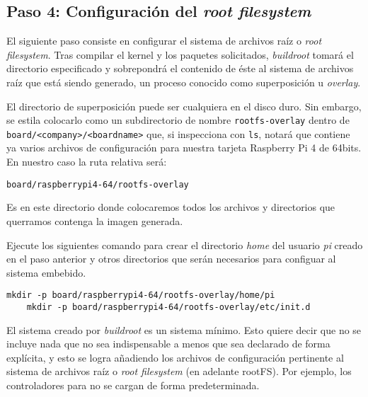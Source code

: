 %
%



\subsection{Paso 4: Configuración del \emph{root filesystem}}%
\label{sec:step4}
El siguiente paso consiste en configurar el sistema de archivos raíz o \emph{root filesystem}.
Tras compilar el kernel y los paquetes solicitados, \emph{buildroot} tomará el directorio especificado y sobrepondrá el contenido de éste al sistema de archivos raíz que está siendo generado, un proceso conocido como superposición u \emph{overlay}.

El directorio de superposición puede ser cualquiera en el disco duro.
Sin embargo, se estila colocarlo como un subdirectorio de nombre \texttt{rootfs-overlay} dentro de \texttt{board/<company>/<boardname>}
que, si inspecciona con \texttt{ls}, notará que contiene ya varios archivos de configuración para nuestra tarjeta Raspberry Pi 4 de 64bits.
En nuestro caso la ruta relativa será:

\begin{Verbatim}[gobble=1]
	board/raspberrypi4-64/rootfs-overlay
\end{Verbatim}

Es en este directorio donde colocaremos todos los archivos y directorios que querramos contenga la imagen generada.

Ejecute los siguientes comando para crear el directorio \emph{home} del usuario \emph{pi} creado en el paso anterior y otros directorios que serán necesarios para configuar al sistema embebido.

\begin{Verbatim}[gobble=1]
	mkdir -p board/raspberrypi4-64/rootfs-overlay/home/pi
	mkdir -p board/raspberrypi4-64/rootfs-overlay/etc/init.d
\end{Verbatim}

El sistema creado por \emph{buildroot} es un sistema mínimo.
Esto quiere decir que no se incluye nada que no sea indispensable a menos que sea declarado de forma explícita,
y esto se logra añadiendo los archivos de configuración pertinente al sistema de archivos raíz o \emph{root filesystem} (en adelante rootFS).
Por ejemplo, los controladores para \IIC{} no se cargan de forma predeterminada.

